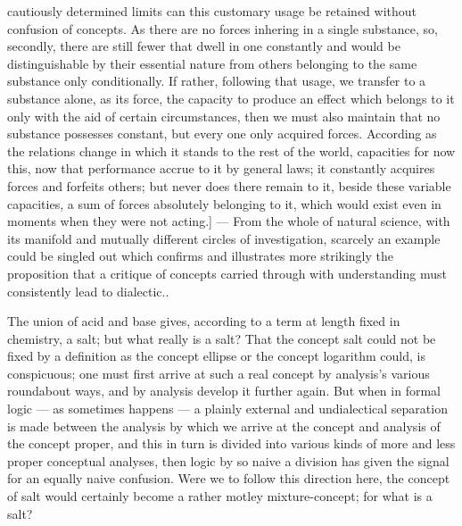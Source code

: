 \documentclass[12pt,a4paper]{book}
\begin{document}
{cautiously determined limits can this customary usage be retained without
confusion of concepts. As there are no forces inhering in a single substance,
so, secondly, there are still fewer that dwell in one constantly and
would be distinguishable by their essential nature from others belonging to the
same substance only conditionally. If rather, following that usage, we transfer
to a substance alone, as its force, the capacity to produce an effect which
belongs to it only with the aid of certain circumstances, then we must also
maintain that no substance possesses constant, but every one only acquired
forces. According as the relations change in which it stands to the rest of the
world, capacities for now this, now that performance accrue to it by general
laws; it constantly acquires forces and forfeits others; but never does there
remain to it, beside these variable capacities, a sum of forces absolutely
belonging to it, which would exist even in moments when they were not acting.]
--- From the whole of natural science, with its manifold and mutually different
circles of investigation, scarcely an example could be singled out which
confirms and illustrates more strikingly the proposition that a critique of
concepts carried through with understanding must consistently lead to
dialectic.}.

The union of acid and base gives, according to a term at length fixed in
chemistry, a salt; but what
really is a salt? That the concept salt could not be fixed by a definition as
the concept ellipse or the concept logarithm could, is conspicuous; one must
first arrive at such a real concept by analysis's various roundabout ways, and
by analysis develop it further again. But when in formal logic --- as sometimes
happens --- a plainly external and undialectical separation is made between the
analysis by which we arrive at the concept and analysis of the concept proper,
and this in turn is divided into various kinds of more and less proper
conceptual analyses, then logic by so naive a division has given the signal for
an equally naive confusion. Were we to follow this direction here, the concept
of salt would certainly become a rather motley mixture-concept; for what is a
salt?
\end{document}
